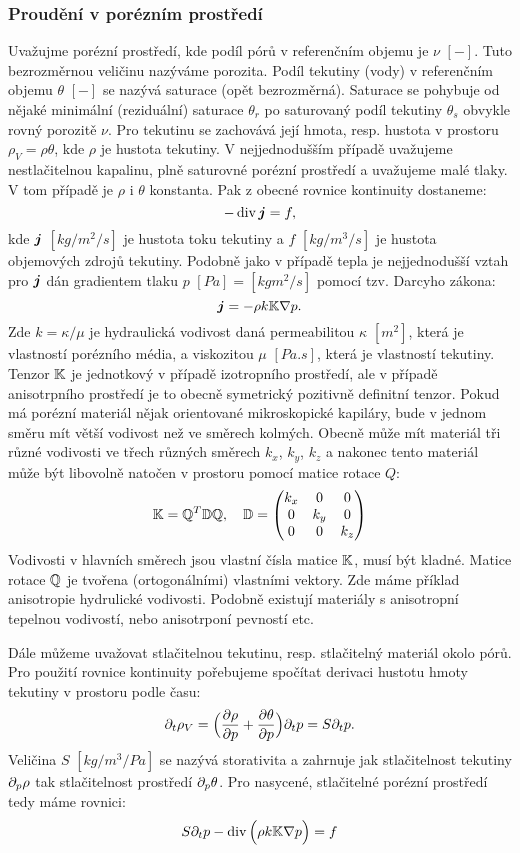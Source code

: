 \subsubsection{Proudění v porézním prostředí}
Uvažujme porézní prostředí, kde podíl pórů v referenčním objemu je $\nu$ $[-]$. Tuto bezrozměrnou veličinu nazýváme porozita. 
Podíl tekutiny (vody) v referenčním objemu $\theta$ $[-]$ se nazývá saturace (opět bezrozměrná). Saturace se pohybuje od nějaké minimální (reziduální)
saturace $\theta_r$ po saturovaný podíl tekutiny $\theta_s$ obvykle rovný porozitě $\nu$. Pro tekutinu se zachovává její hmota, resp. hustota v prostoru
$\rho_V = \rho \theta$, 
kde $\rho$ je hustota tekutiny. V nejjednodušším případě uvažujeme nestlačitelnou kapalinu, plně saturovné porézní prostředí
a uvažujeme malé tlaky. V tom případě je $\rho$ i $\theta$ konstanta. Pak z obecné rovnice kontinuity dostaneme:
\[
    -\operatorname{div} \mathbf{\boldsymbol{j}} = f,
\]
kde $\mathbf{\boldsymbol{j}}$ $[kg/m^2/s]$ je hustota toku tekutiny  a $f$ $[kg/m^3/s]$ je hustota objemových zdrojů tekutiny. Podobně jako v případě tepla 
je nejjednodušší vztah pro $\mathbf{\boldsymbol{j}}$ dán gradientem tlaku $p$ $[Pa]=[kgm^2/s]$ pomocí tzv. Darcyho zákona:
\[
    \mathbf{\boldsymbol{j}} = -\rho k{\mathbb{K}} \nabla p.
\]
Zde $k=\kappa/\mu$ je hydraulická vodivost daná permeabilitou $\kappa$ $[m^2]$, která je vlastností porézního média, a viskozitou $\mu$ $[Pa.s]$, 
která je vlastností tekutiny. Tenzor ${\mathbb{K}}$ je jednotkový v případě izotropního prostředí, ale v případě anisotrpního prostředí je to obecně symetrický 
pozitivně definitní tenzor. Pokud má porézní materiál nějak orientované mikroskopické kapiláry, bude v jednom směru mít větší vodivost než ve směrech kolmých. 
Obecně může mít materiál tři různé vodivosti ve třech různých směrech $k_x$, $k_y$, $k_z$ a nakonec tento materiál může být libovolně natočen v prostoru 
pomocí matice rotace $Q$:
\[
    {\mathbb{K}} = {\mathbb{Q}}^T {\mathbb{D}} {\mathbb{Q}},\quad 
    {\mathbb{D}} = \begin{pmatrix}
                k_x     &0      &0\\
                0       &k_y    &0\\
                0       &0      &k_z                
            \end{pmatrix}
\]
Vodivosti v hlavních směrech jsou vlastní čísla matice ${\mathbb{K}}$, musí být kladné. Matice rotace ${\mathbb{Q}}$ je tvořena (ortogonálními) vlastními vektory.
Zde máme příklad anisotropie hydrulické vodivosti. Podobně existují materiály s anisotropní tepelnou vodivostí, nebo anisotrponí pevností etc.

Dále můžeme uvažovat stlačitelnou tekutinu, resp. stlačitelný materiál okolo pórů. Pro použití rovnice kontinuity pořebujeme spočítat derivaci 
hustotu hmoty tekutiny v prostoru podle času:
\[
    \partial_t \rho_V = \Big(\frac{\partial \rho}{\partial p} + \frac{\partial \theta}{\partial p}\Big)\partial_t p = S\partial_t p.
\]
Veličina $S$ $[kg/m^3/Pa]$ se nazývá storativita a zahrnuje jak stlačitelnost tekutiny $\partial_p \rho$ tak stlačitelnost prostředí $\partial_p \theta$.
Pro nasycené, stlačitelné porézní prostředí tedy máme rovnici:
\[
    S \partial_t p -\operatorname{div}\Big( \rho k{\mathbb{K}} \nabla p\Big) = f
\]

